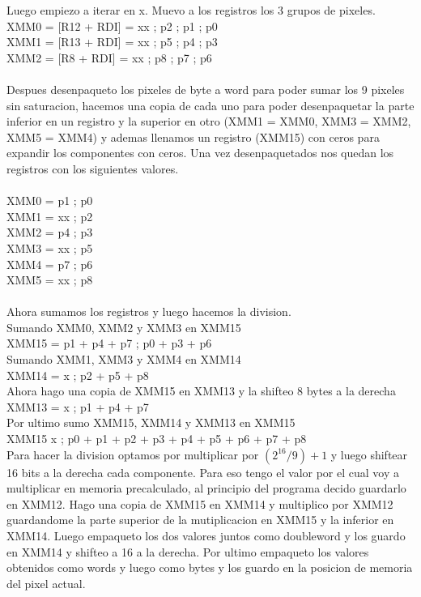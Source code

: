 Luego empiezo a iterar en x. Muevo a los registros los 3 grupos de pixeles.\\
XMM0 = [R12 + RDI] = xx ; p2 ; p1 ; p0 \\
XMM1 = [R13 + RDI] = xx ; p5 ; p4 ; p3 \\
XMM2 = [R8  + RDI] = xx ; p8 ; p7 ; p6 \\
\\
Despues desenpaqueto los pixeles de byte a word para poder sumar los 9 pixeles sin saturacion, hacemos una copia de cada uno para poder desenpaquetar la parte inferior en un registro y la superior en otro (XMM1 = XMM0, XMM3 = XMM2, XMM5 = XMM4) y ademas llenamos un registro (XMM15) con ceros para expandir los componentes con ceros.
Una vez desenpaquetados nos quedan los registros con los siguientes valores. \\
\\
	XMM0 = p1 ; p0 \\
 	XMM1 = xx ; p2 \\
 	XMM2 = p4 ; p3 \\
	XMM3 = xx ; p5 \\ 
	XMM4 = p7 ; p6 \\
	XMM5 = xx ; p8 \\
\\
Ahora sumamos los registros y luego hacemos la division. \\
Sumando XMM0, XMM2 y XMM3 en XMM15 \\
	XMM15 = p1 + p4 + p7 ; p0 + p3 + p6	\\
Sumando XMM1, XMM3 y XMM4 en XMM14	\\
	XMM14 = x ; p2 + p5 + p8 \\
Ahora hago una copia de XMM15 en XMM13 y la shifteo 8 bytes a la derecha \\
	XMM13 = x ; p1 + p4 + p7 \\
Por ultimo sumo XMM15, XMM14 y XMM13 en XMM15 \\
	XMM15 x ; p0 + p1 + p2 + p3 + p4 + p5 + p6 + p7 + p8 \\

Para hacer la division optamos por multiplicar por $(2^{16} / 9) + 1$ y luego shiftear 16 bits a la derecha cada componente. Para eso tengo el valor por el cual voy a multiplicar en memoria precalculado, al principio del programa decido guardarlo en XMM12.
Hago una copia de XMM15 en XMM14 y multiplico por XMM12 guardandome la parte superior de la mutiplicacion en XMM15 y la inferior en XMM14. Luego empaqueto los dos valores juntos como doubleword y los guardo en XMM14 y shifteo a 16 a la derecha.
Por ultimo empaqueto los valores obtenidos como words y luego como bytes y los guardo en la posicion de memoria del pixel actual.


